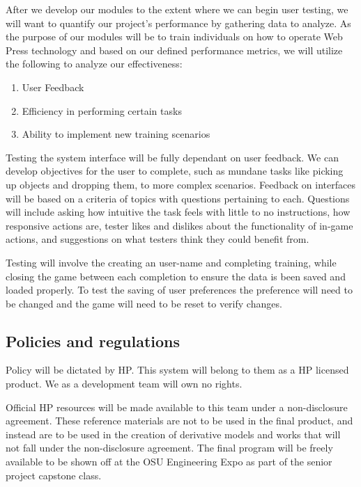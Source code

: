 \documentclass[onecolumn, draftclsnofoot,10pt, compsoc]{IEEEtran}
\begin{document}
After we develop our modules to the extent where we can begin user testing, we will want to quantify our project's performance by gathering data to analyze. As the purpose of our modules will be to train individuals on how to operate Web Press technology and based on our defined performance metrics, we will utilize the following to analyze our effectiveness: 
\begin{enumerate}
    \item User Feedback
    \item Efficiency in performing certain tasks
    \item Ability to implement new training scenarios
\end{enumerate}
Testing the system interface will be fully dependant on user feedback. We can develop objectives for the user to complete, such as mundane tasks like picking up objects and dropping them, to more complex scenarios. Feedback on interfaces will be based on a criteria of topics with questions pertaining to each. Questions will include asking how intuitive the task feels with little to no instructions, how responsive actions are, tester likes and dislikes about the functionality of in-game actions, and suggestions on what testers think they could benefit from.

Testing will involve the creating an user-name and completing training, while closing the game between each completion to ensure the data is been saved and loaded properly. To test the saving of user preferences the preference will need to be changed and the game will need to be reset to verify changes.

\subsection{Policies and regulations}
Policy will be dictated by HP. This system will belong to them as a HP licensed product. We as a development team will own no rights.

Official HP resources will be made available to this team under a non-disclosure agreement. These reference materials are not to be used in the final product, and instead are to be used in the creation of derivative models and works that will not fall under the non-disclosure agreement. The final program will be freely available to be shown off at the OSU Engineering Expo as part of the senior project capstone class.
\end{document}
